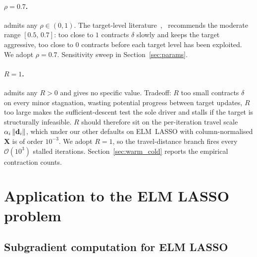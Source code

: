 \paragraph{$\rho = 0.7$.}
\cite[Lemma~3.8]{dantonio2009deflected} admits any $\rho \in (0, 1)$. The target-level literature~\cite{brannlund1995generalized,goffin1999convergence,bertsekas1999nonlinear},~\cite[Slide 14]{frangioni-slides-nonsmooth} recommends the moderate range $[0.5,\,0.7]$: too close to $1$ contracts $\delta$ slowly and keeps the target aggressive, too close to $0$ contracts before each target level has been exploited. We adopt $\rho = 0.7$. Sensitivity sweep in Section~\ref{sec:params}.

\paragraph{$R = 1$.}
\cite[Lemma~3.8]{dantonio2009deflected} admits any $R > 0$ and gives no specific value. Tradeoff: $R$ too small contracts $\delta$ on every minor stagnation, wasting potential progress between target updates, $R$ too large makes the sufficient-descent test the sole driver and stalls if the target is structurally infeasible. $R$ should therefore sit on the per-iteration travel scale $\alpha_i\left\lVert \mathbf{d}_i \right\rVert$, which under our other defaults on ELM~LASSO with column-normalised $\mathbf{X}$ is of order $10^{-3}$. We adopt $R = 1$, so the travel-distance branch fires every $\mathcal{O}(10^{3})$ stalled iterations. Section~\ref{sec:warm_cold} reports the empirical contraction counts.

\section{Application to the ELM LASSO problem}
\label{sec:dsm_application}

\subsection{Subgradient computation for ELM LASSO}
\label{sec:dsm_subgrad}

